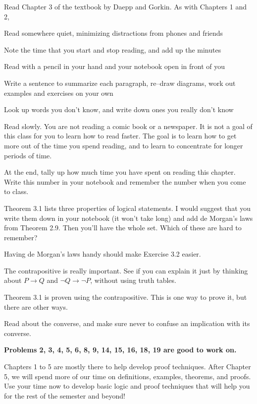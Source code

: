 
Read Chapter 3 of the textbook by Daepp and Gorkin.
As with Chapters 1 and 2,
\blist{0.0in}
\item Read somewhere quiet, minimizing distractions from phones and friends
\item Note the time that you start and stop reading, and add up the minutes
\item Read with a pencil in your hand and your notebook open in front of you
\item Write a sentence to summarize each paragraph, re--draw diagrams, work out examples and exercises on your own
\item Look up words you don't know, and write down ones you really don't know
\item Read slowly.  You are not reading a comic book or a newspaper.  It is not a goal of this class for you to learn how to read faster.  The goal is to learn how to get more out of the time you spend reading, and to learn to concentrate for longer periods of time.
\item At the end, tally up how much time you have spent on reading this chapter.
Write this number in your notebook and remember the number when you come to class.
\elist

Theorem 3.1 lists three properties of logical statements.
I would suggest that you write them down in your notebook (it won't take long) and add de Morgan's laws from Theorem 2.9.
Then you'll have the whole set.
Which of these are hard to remember?

Having de Morgan's laws handy should make Exercise 3.2 easier.

The contrapositive is really important.
See if you can explain it just by thinking about $P \to Q$ and $\neg Q \to \neg P$, without using truth tables.

Theorem 3.1 is proven using the contrapositive.
This is one way to prove it, but there are other ways.

Read about the converse, and make sure never to confuse an implication with its converse.

{\bf Problems 2, 3, 4, 5, 6, 8, 9, 14, 15, 16, 18, 19 are good to work on.}

Chapters 1 to 5 are mostly there to help develop proof techniques.  After Chapter 5, we will spend more of our time on definitions, examples, theorems, and proofs.
Use your time now to develop basic logic and proof techniques that will help you for the rest of the semester and beyond!


\vfill          %
